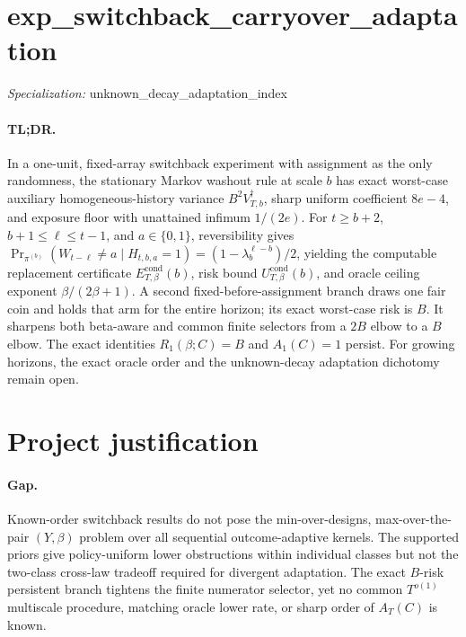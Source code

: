 \documentclass{article}
\begin{document}
\sloppy

\section*{exp\_\allowbreak{}switchback\_\allowbreak{}carryover\_\allowbreak{}adaptation}

\noindent\textit{Specialization:} unknown\_\allowbreak{}decay\_\allowbreak{}adaptation\_\allowbreak{}index\par

\paragraph{TL;DR.} In a one-unit, fixed-array switchback experiment with assignment as the only randomness, the stationary Markov washout rule at scale \(b\) has exact worst-case auxiliary homogeneous-history variance \(B^2V_{T,b}^{\dagger}\), sharp uniform coefficient \(8e-4\), and exposure floor with unattained infimum \(1/(2e)\). For \(t\ge b+2\), \(b+1\le\ell\le t-1\), and \(a\in\{0,1\}\), reversibility gives \(\Pr_{\pi^{(b)}}(W_{t-\ell}\ne a\mid H_{t,b,a}=1)=(1-\lambda_b^{\ell-b})/2\), yielding the computable replacement certificate \(E_{T,\beta}^{\mathrm{cond}}(b)\), risk bound \(U_{T,\beta}^{\mathrm{cond}}(b)\), and oracle ceiling exponent \(\beta/(2\beta+1)\). A second fixed-before-assignment branch draws one fair coin and holds that arm for the entire horizon; its exact worst-case risk is \(B\). It sharpens both beta-aware and common finite selectors from a \(2B\) elbow to a \(B\) elbow. The exact identities \(R_1(\beta;C)=B\) and \(A_1(C)=1\) persist. For growing horizons, the exact oracle order and the unknown-decay adaptation dichotomy remain open.

\section{Project justification}

\paragraph{Gap.} Known-order switchback results do not pose the min-over-designs, max-over-the-pair \((Y,\beta)\) problem over all sequential outcome-adaptive kernels. The supported priors give policy-uniform lower obstructions within individual classes but not the two-class cross-law tradeoff required for divergent adaptation. The exact \(B\)-risk persistent branch tightens the finite numerator selector, yet no common \(T^{o(1)}\) multiscale procedure, matching oracle lower rate, or sharp order of \(A_T(C)\) is known.
\end{document}
